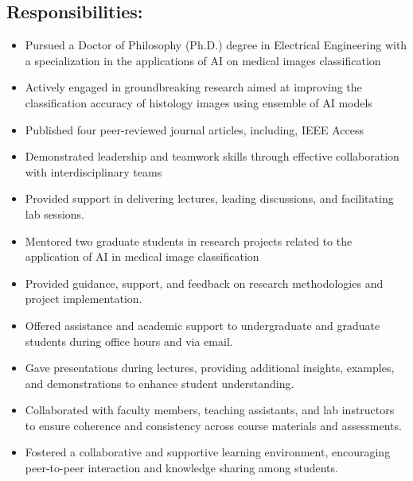 \documentclass[letterpaper,
		10pt]{article}
\begin{document}
\subsection{Responsibilities:}
\begin{itemize}
\item  Pursued a Doctor of Philosophy (Ph.D.) degree in Electrical Engineering with a specialization in the applications of AI on medical images classification 
\item  Actively engaged in groundbreaking research aimed at improving the classification accuracy of histology images using ensemble of AI models
\item  Published four peer-reviewed journal articles, including, IEEE Access
\item Demonstrated leadership and teamwork skills through effective collaboration with interdisciplinary teams
\item Provided support in delivering lectures, leading discussions, and facilitating lab sessions.
\item Mentored two graduate students in research projects related to the application of AI in medical image classification
\item Provided guidance, support, and feedback on research methodologies and project implementation.
\item Offered assistance and academic support to undergraduate and graduate students during office hours and via email.
\item Gave presentations during lectures, providing additional insights, examples, and demonstrations to enhance student understanding.
\item Collaborated with faculty members, teaching assistants, and lab instructors to ensure coherence and consistency across course materials and assessments.
\item Fostered a collaborative and supportive learning environment, encouraging peer-to-peer interaction and knowledge sharing among students.
\end{itemize}
\end{document}
